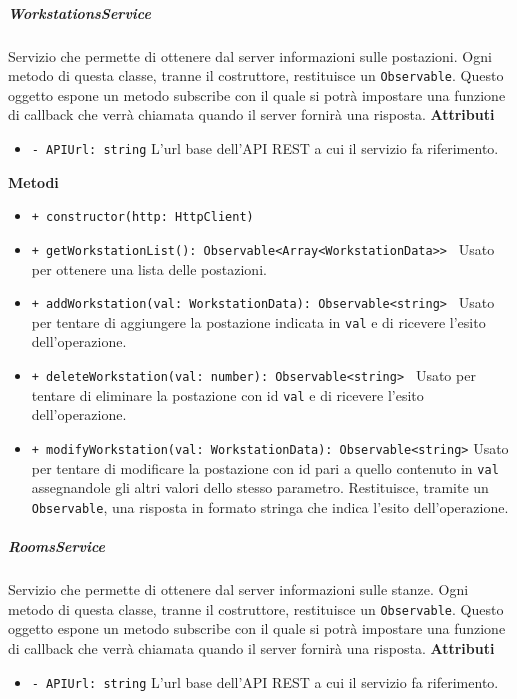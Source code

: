 \subparagraph{WorkstationsService}
Servizio che permette di ottenere dal server informazioni sulle postazioni. Ogni metodo di questa classe, tranne il costruttore, restituisce un \texttt{Observable}. Questo oggetto espone un metodo subscribe con il quale si potrà impostare una funzione di callback che verrà chiamata quando il server fornirà una risposta. \newline
\textbf{Attributi}
\begin{itemize}
	\item \texttt{- APIUrl: string} \newline
	L'url base dell'API REST a cui il servizio fa riferimento.
\end{itemize}
\textbf{Metodi}
\begin{itemize}
	\item \texttt{+ constructor(http: HttpClient) 	}
	\item \texttt{+ getWorkstationList(): Observable<Array<WorkstationData>> 	} \newline
	Usato per ottenere una lista delle postazioni.
	\item \texttt{+ addWorkstation(val: WorkstationData): Observable<string> 	} \newline
	Usato per tentare di aggiungere la postazione indicata in \texttt{val} e di ricevere l'esito dell'operazione.
	\item \texttt{+ deleteWorkstation(val: number): Observable<string> 	} \newline
	Usato per tentare di eliminare la postazione con id \texttt{val} e di ricevere l'esito dell'operazione.
	\item \texttt{+ modifyWorkstation(val: WorkstationData): Observable<string>} \newline
	Usato per tentare di modificare la postazione con id pari a quello contenuto in \texttt{val} assegnandole gli altri valori dello stesso parametro. Restituisce, tramite un \texttt{Observable}, una risposta in formato stringa che indica l'esito dell'operazione.
\end{itemize}
\subparagraph{RoomsService}
Servizio che permette di ottenere dal server informazioni sulle stanze. Ogni metodo di questa classe, tranne il costruttore, restituisce un \texttt{Observable}. Questo oggetto espone un metodo subscribe con il quale si potrà impostare una funzione di callback che verrà chiamata quando il server fornirà una risposta. \newline
\textbf{Attributi}
\begin{itemize}
	\item \texttt{- APIUrl: string} \newline
	L'url base dell'API REST a cui il servizio fa riferimento.
\end{itemize}
